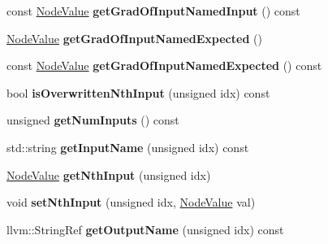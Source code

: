 \begin{DoxyCompactItemize}
const \hyperlink{structglow_1_1_node_value}{Node\+Value} {\bfseries get\+Grad\+Of\+Input\+Named\+Input} () const
\item 
\mbox{\label{classglow_1_1_regression_grad_node_a6fc3737242241ddacdf0e04431f65c93}} 
\hyperlink{structglow_1_1_node_value}{Node\+Value} {\bfseries get\+Grad\+Of\+Input\+Named\+Expected} ()
\item 
\mbox{\label{classglow_1_1_regression_grad_node_aff77aa022e946a1394f4b2e956650829}} 
const \hyperlink{structglow_1_1_node_value}{Node\+Value} {\bfseries get\+Grad\+Of\+Input\+Named\+Expected} () const
\item 
\mbox{\label{classglow_1_1_regression_grad_node_ab06b42b4404d70f83b2ba49ef45c49f7}} 
bool {\bfseries is\+Overwritten\+Nth\+Input} (unsigned idx) const
\item 
\mbox{\label{classglow_1_1_regression_grad_node_a1c27dea441341056efc3b005c0919104}} 
unsigned {\bfseries get\+Num\+Inputs} () const
\item 
\mbox{\label{classglow_1_1_regression_grad_node_afe731e60aceeb99fae358ebc8cc21c1a}} 
std\+::string {\bfseries get\+Input\+Name} (unsigned idx) const
\item 
\mbox{\label{classglow_1_1_regression_grad_node_a995c0b2b0a926e2a276e4a7af08e4f3e}} 
\hyperlink{structglow_1_1_node_value}{Node\+Value} {\bfseries get\+Nth\+Input} (unsigned idx)
\item 
\mbox{\label{classglow_1_1_regression_grad_node_a15cacd6320c183e6bc34dd3645c972fb}} 
void {\bfseries set\+Nth\+Input} (unsigned idx, \hyperlink{structglow_1_1_node_value}{Node\+Value} val)
\item 
\mbox{\label{classglow_1_1_regression_grad_node_a5cc1bcbbb9d94ca0d961b3a6265c7d3d}} 
llvm\+::\+String\+Ref {\bfseries get\+Output\+Name} (unsigned idx) const
\item 
\mbox{\label{classglow_1_1_regression_grad_node_a553d39b9e5d38834d2912c2fa8f4715d}} 

\end{DoxyCompactItemize}

